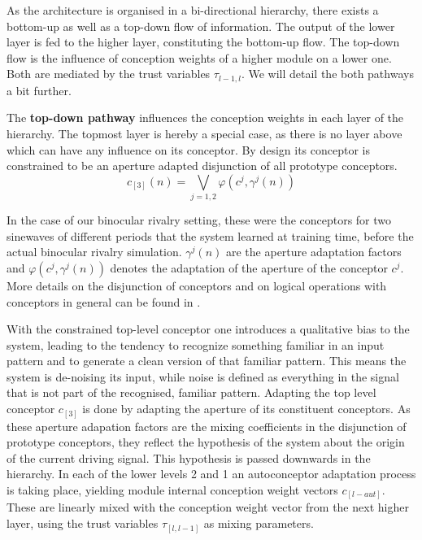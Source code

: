 \documentclass{frontiersSCNS} %
\begin{document}
    As the architecture is organised in a bi-directional hierarchy, there exists a bottom-up as well as a top-down flow of information. The output of the lower layer is fed to the higher layer, constituting the bottom-up flow. The top-down flow is the influence of conception weights of a higher module on a lower one. Both are mediated by the trust variables $\tau_{l-1,l}$. We will detail the both pathways a bit further.
    
    The \textbf{top-down pathway} influences the conception weights in each layer of the hierarchy. The topmost layer is hereby a special case, as there is no layer above which can have any influence on its conceptor. By design its conceptor is constrained to be an aperture adapted disjunction of all prototype conceptors. 
    \begin{equation}
       c_{[3]}(n) = \bigvee\limits_{j = 1, 2} \varphi(c^j , \gamma^j (n))
    \end{equation}
    
    In the case of our binocular rivalry setting, these were the conceptors for two sinewaves of different periods that the system learned at training time, before the actual binocular rivalry simulation. $\gamma^j (n)$ are the aperture adaptation factors and $\varphi(c^j , \gamma^j (n))$ denotes the adaptation of the aperture of the conceptor $c^j$. More details on the disjunction of conceptors and on logical operations with conceptors in general can be found in \cite{Jaeger2014}. 
    
    With the constrained top-level conceptor one introduces a qualitative bias to the system, leading to the tendency to recognize something familiar in an input pattern and to generate a clean version of that familiar pattern. This means the system is de-noising its input, while noise is defined as everything in the signal that is not part of the recognised, familiar pattern. Adapting the top level conceptor $c_{[3]}$ is done by adapting the aperture of its constituent conceptors. As these aperture adapation factors are the mixing coefficients in the disjunction of prototype conceptors, they reflect the hypothesis of the system about the origin of the current driving signal. 
    This hypothesis is passed downwards in the hierarchy. In each of the lower levels 2 and 1 an autoconceptor adaptation process is taking place, yielding module internal conception weight vectors $c_{[l-aut]}$. These are linearly mixed with the conception weight vector from the next higher layer, using the trust variables $\tau_{[l,l-1]}$ as mixing parameters. 
    
\end{document}
